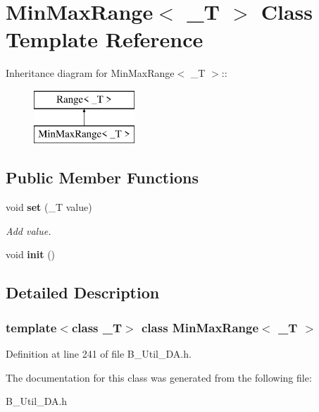 \section{MinMaxRange$<$ \_\-T $>$ Class Template Reference}
\label{classMinMaxRange}
Inheritance diagram for MinMaxRange$<$ \_\-T $>$::\begin{figure}[H]
\begin{center}
\leavevmode
\includegraphics[height=2cm]{classMinMaxRange}
\end{center}
\end{figure}
\subsection*{Public Member Functions}
\begin{DoxyCompactItemize}
\item 
void {\bf set} (\_\-T value)\label{classMinMaxRange_a16b7b6c4aaf960f65df1f168e9b43e06}

\begin{DoxyCompactList}\small\item\em Add value. \item\end{DoxyCompactList}\item 
void {\bfseries init} ()\label{classMinMaxRange_a62a97ff19a090c75c97945983bc56e7a}

\end{DoxyCompactItemize}


\subsection{Detailed Description}
\subsubsection*{template$<$class \_\-T$>$ class MinMaxRange$<$ \_\-T $>$}



Definition at line 241 of file B\_\-Util\_\-DA.h.

The documentation for this class was generated from the following file:\begin{DoxyCompactItemize}
\item 
B\_\-Util\_\-DA.h\end{DoxyCompactItemize}
